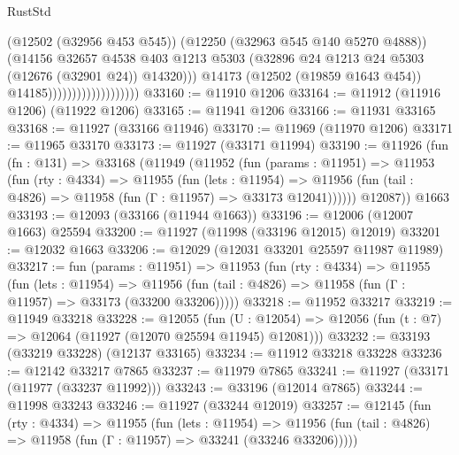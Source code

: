 \begin{lexlean}{RustStd}
\begin{coremodule}
                                            (@12502 (@32956 @453 @545))
                                            (@12250 (@32963 @545 @140 @5270 @4888))
                                            (@14156
                                              @32657
                                              @4538
                                              @403
                                              @1213
                                              @5303
                                              (@32896
                                                @24
                                                @1213
                                                @24
                                                @5303
                                                (@12676 (@32901 @24))
                                                @14320)))
                                          @14173
                                          (@12502 (@19859 @1643 @454))
                                          @14185)))))))))))))))))))
@33160 := @11910 @1206
@33164 := @11912 (@11916 @1206) (@11922 @1206)
@33165 := @11941 @1206
@33166 := @11931 @33165
@33168 := @11927 (@33166 @11946)
@33170 := @11969 (@11970 @1206)
@33171 := @11965 @33170
@33173 := @11927 (@33171 @11994)
@33190 := @11926
    (fun (fn : @131) =>
    @33168
      (@11949
        (@11952
          (fun (params : @11951) =>
          @11953
            (fun (rty : @4334) =>
            @11955
              (fun (lets : @11954) =>
              @11956 (fun (tail : @4826) => @11958 (fun (Γ : @11957) => @33173 @12041))))))
        @12087))
    @1663
@33193 := @12093 (@33166 (@11944 @1663))
@33196 := @12006 (@12007 @1663) @25594
@33200 := @11927 (@11998 (@33196 @12015) @12019)
@33201 := @12032 @1663
@33206 := @12029 (@12031 @33201 @25597 @11987 @11989)
@33217 := fun (params : @11951) =>
  @11953
    (fun (rty : @4334) =>
    @11955
      (fun (lets : @11954) =>
      @11956 (fun (tail : @4826) => @11958 (fun (Γ : @11957) => @33173 (@33200 @33206)))))
@33218 := @11952 @33217
@33219 := @11949 @33218
@33228 := @12055
    (fun (U : @12054) => @12056 (fun (t : @7) => @12064 (@11927 (@12070 @25594 @11945) @12081)))
@33232 := @33193 (@33219 @33228) (@12137 @33165)
@33234 := @11912 @33218 @33228
@33236 := @12142 @33217 @7865
@33237 := @11979 @7865
@33241 := @11927 (@33171 (@11977 (@33237 @11992)))
@33243 := @33196 (@12014 @7865)
@33244 := @11998 @33243
@33246 := @11927 (@33244 @12019)
@33257 := @12145
    (fun (rty : @4334) =>
    @11955
      (fun (lets : @11954) =>
      @11956 (fun (tail : @4826) => @11958 (fun (Γ : @11957) => @33241 (@33246 @33206)))))

\end{coremodule}
\end{lexlean}
